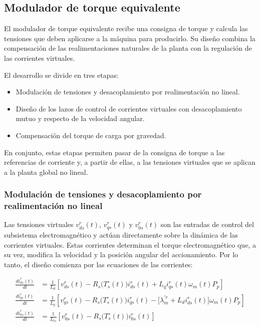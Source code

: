 \documentclass[blue,fullpaper]{ludusofficial}  %
\begin{document}
\subsection{Modulador de torque equivalente}
El modulador de torque equivalente recibe una consigna de torque y calcula las tensiones que deben aplicarse a la máquina para producirlo. Su diseño combina la compensación de las realimentaciones naturales de la planta con la regulación de las corrientes virtuales.

El desarrollo se divide en tres etapas:
\begin{itemize}
    \item Modulación de tensiones y desacoplamiento por realimentación no lineal.
    \item Diseño de los lazos de control de corrientes virtuales con desacoplamiento mutuo y respecto de la velocidad angular.
    \item Compensación del torque de carga por gravedad.
\end{itemize}

En conjunto, estas etapas permiten pasar de la consigna de torque a las referencias de corriente y, a partir de ellas, a las tensiones virtuales que se aplican a la planta global no lineal.



\subsubsection{Modulación de tensiones y desacoplamiento por realimentación no lineal}

Las tensiones virtuales $v_{ds}^{r}(t)$, $v_{qs}^{r}(t)$ y $v_{0s}^{r}(t)$ son las entradas de control del subsistema electromagnético y actúan directamente sobre la dinámica de las corrientes virtuales. Estas corrientes determinan el torque electromagnético que, a su vez, modifica la velocidad y la posición angular del accionamiento. Por lo tanto, el diseño comienza por las ecuaciones de las corrientes:

\begin{align*}
\frac{di_{ds}^{r}(t)}{dt} & = \frac{1}{L_{d}} \left[ v_{ds}^{r}(t) - R_{s} \Big( T_{s}^{\circ} (t) \Big) i_{ds}^{r}(t) + L_{q}i_{qs}^{r}(t) \omega_{m}(t)P_{p}  \right]  \\
\frac{di_{qs}^{r}(t)}{dt}  & = \frac{1}{L_{q} } \left[ v_{qs}^{r}(t) - R_{s} \Big( T_{s}^{\circ} (t) \Big) i_{qs}^{r}(t) - \big[ \lambda_{m}^{'r} + L_{d} i_{ds}^{r}(t) \big] \omega_{m}(t)P_{p} \right]  \\
\frac{di_{0s}^{r}(t)}{dt} & = \frac{1}{ L_{ls} } \left[ v_{0s}^{r}(t) - R_{s} \Big( T_{s}^{\circ} (t) \Big) i_{0s}^{r}(t) \right]
\end{align*}
\end{document}
